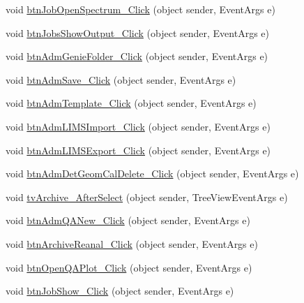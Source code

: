 \begin{DoxyCompactItemize}
\item 
void \hyperlink{class_scintilab_1_1_form_main_a6306e9b64d524deb6b9f5fb0a6259647}{btn\+Job\+Open\+Spectrum\+\_\+\+Click} (object sender, Event\+Args e)
\item 
void \hyperlink{class_scintilab_1_1_form_main_adaef6dd7659666d44b846de21d5b14df}{btn\+Jobs\+Show\+Output\+\_\+\+Click} (object sender, Event\+Args e)
\item 
void \hyperlink{class_scintilab_1_1_form_main_a953db9b2ca7c1a92c327871b4a448934}{btn\+Adm\+Genie\+Folder\+\_\+\+Click} (object sender, Event\+Args e)
\item 
void \hyperlink{class_scintilab_1_1_form_main_ae1b0cb30ebcecd34d4ad1a59cbce6d38}{btn\+Adm\+Save\+\_\+\+Click} (object sender, Event\+Args e)
\item 
void \hyperlink{class_scintilab_1_1_form_main_a6e20ae5c9d1546f174e52e347657e6db}{btn\+Adm\+Template\+\_\+\+Click} (object sender, Event\+Args e)
\item 
void \hyperlink{class_scintilab_1_1_form_main_ab14307d4fa2fc950a86baf6b0a56514c}{btn\+Adm\+L\+I\+M\+S\+Import\+\_\+\+Click} (object sender, Event\+Args e)
\item 
void \hyperlink{class_scintilab_1_1_form_main_ad9f04197f41acec2571a81ca2966069f}{btn\+Adm\+L\+I\+M\+S\+Export\+\_\+\+Click} (object sender, Event\+Args e)
\item 
void \hyperlink{class_scintilab_1_1_form_main_a99614128337091c0589a30ba511397b6}{btn\+Adm\+Det\+Geom\+Cal\+Delete\+\_\+\+Click} (object sender, Event\+Args e)
\item 
void \hyperlink{class_scintilab_1_1_form_main_a947d821789ec1a55af6af94c2faea82d}{tv\+Archive\+\_\+\+After\+Select} (object sender, Tree\+View\+Event\+Args e)
\item 
void \hyperlink{class_scintilab_1_1_form_main_a9e03fe4c4af959f108ded057804996f6}{btn\+Adm\+Q\+A\+New\+\_\+\+Click} (object sender, Event\+Args e)
\item 
void \hyperlink{class_scintilab_1_1_form_main_af337ca12fa73a28ae1c34b7169777d69}{btn\+Archive\+Reanal\+\_\+\+Click} (object sender, Event\+Args e)
\item 
void \hyperlink{class_scintilab_1_1_form_main_a267fcaa644ed5e84053883a9164adf6b}{btn\+Open\+Q\+A\+Plot\+\_\+\+Click} (object sender, Event\+Args e)
\item 
void \hyperlink{class_scintilab_1_1_form_main_a0a801bd487880ec77bdd03a36926a660}{btn\+Job\+Show\+\_\+\+Click} (object sender, Event\+Args e)
\item 

\end{DoxyCompactItemize}
